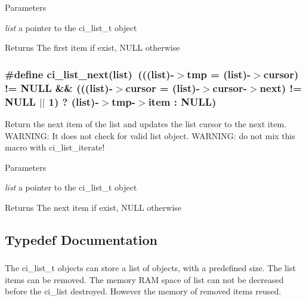 \begin{DoxyParams}{Parameters}
\item[{\em list}]a pointer to the ci\_\-list\_\-t object \end{DoxyParams}
\begin{DoxyReturn}{Returns}
The first item if exist, NULL otherwise 
\end{DoxyReturn}
\hypertarget{group__LISTS_gaeb3e08e79c3a29024821a46bb76d9870}{
\subsubsection[{ci\_\-list\_\-next}]{\setlength{\rightskip}{0pt plus 5cm}\#define ci\_\-list\_\-next(list)~(((list)-\/$>$tmp = (list)-\/$>$cursor) != NULL \&\& (((list)-\/$>$cursor = (list)-\/$>$cursor-\/$>$next) != NULL $|$$|$ 1) ? (list)-\/$>$tmp-\/$>$item : NULL)}}
\label{group__LISTS_gaeb3e08e79c3a29024821a46bb76d9870}


Return the next item of the list and updates the list cursor to the next item. WARNING: It does not check for valid list object. WARNING: do not mix this macro with ci\_\-list\_\-iterate!


\begin{DoxyParams}{Parameters}
\item[{\em list}]a pointer to the ci\_\-list\_\-t object \end{DoxyParams}
\begin{DoxyReturn}{Returns}
The next item if exist, NULL otherwise 
\end{DoxyReturn}


\subsection{Typedef Documentation}
\hypertarget{group__LISTS_ga785498c08d3d0440e1403146d0dfdb57}{
\subsubsection[{ci\_\-list\_\-t}]{}}
\label{group__LISTS_ga785498c08d3d0440e1403146d0dfdb57}


The ci\_\-list\_\-t objects can store a list of objects, with a predefined size. The list items can be removed. The memory RAM space of list can not be decreased before the ci\_\-list destroyed. However the memory of removed items reused. 

